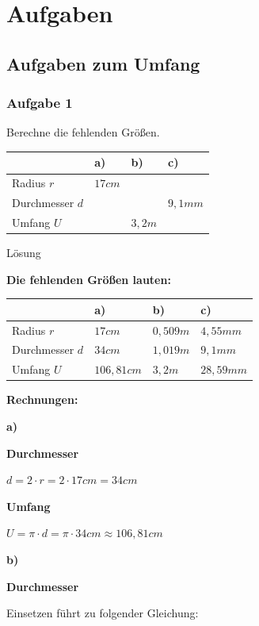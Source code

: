 \documentclass[
  ngerman,
]{book}
\begin{document}
\hypertarget{aufgaben-5}{%
\section*{Aufgaben}\label{aufgaben-5}}

\hypertarget{aufgaben-zum-umfang}{%
\subsection*{Aufgaben zum Umfang}\label{aufgaben-zum-umfang}}

\hypertarget{aufgabe-1-5}{%
\subsubsection*{Aufgabe 1}\label{aufgabe-1-5}}

Berechne die fehlenden Größen.

\begin{longtable}[]{@{}llll@{}}
\toprule
& a) & b) & c)\tabularnewline
\midrule
\endhead
Radius \(r\) & \(17cm\) & &\tabularnewline
Durchmesser \(d\) & & & \(9,1 mm\)\tabularnewline
Umfang \(U\) & & \(3,2m\) &\tabularnewline
\bottomrule
\end{longtable}

Lösung

\textbf{Die fehlenden Größen lauten:}

\begin{longtable}[]{@{}llll@{}}
\toprule
& a) & b) & c)\tabularnewline
\midrule
\endhead
Radius \(r\) & \(17cm\) & \(0,509m\) & \(4,55mm\)\tabularnewline
Durchmesser \(d\) & \(34cm\) & \(1,019m\) & \(9,1 mm\)\tabularnewline
Umfang \(U\) & \(106,81cm\) & \(3,2m\) & \(28,59mm\)\tabularnewline
\bottomrule
\end{longtable}

\textbf{Rechnungen:}

\textbf{a)}

\textbf{Durchmesser}

\(d=2 \cdot r = 2 \cdot 17 cm = 34 cm\)

\textbf{Umfang}

\(U = \pi \cdot d = \pi \cdot 34 cm \approx 106,81 cm\)

\textbf{b)}

\textbf{Durchmesser}

Einsetzen führt zu folgender Gleichung:
\end{document}
